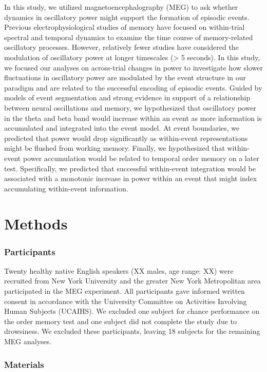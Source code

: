 In this study, we utilized magnetoencephalography (MEG) to ask whether
dynamics in oscillatory power might support the formation of episodic
events. Previous electrophysiological studies of memory have focused on
within-trial spectral and temporal dynamics to examine the time course
of memory-related oscillatory processes. However, relatively fewer
studies have considered the modulation of oscillatory power at longer
timescales (\textgreater{} 5 seconds). In this study, we focused our
analyses on across-trial changes in power to investigate how slower
fluctuations in oscillatory power are modulated by the event structure
in our paradigm and are related to the successful encoding of episodic
events. Guided by models of event segmentation and strong evidence in
support of a relationship between neural oscillations and memory, we
hypothesized that oscillatory power in the theta and beta band would
increase within an event as more information is accumulated and
integrated into the event model. At event boundaries, we predicted that
power would drop significantly as within-event representations might be
flushed from working memory. Finally, we hypothesized that within-event
power accumulation would be related to temporal order memory on a later
test. Specifically, we predicted that successful within-event
integration would be associated with a monotonic increase in power
within an event that might index accumulating within-event information.

\section{Methods}\label{methods}

\subsubsection{Participants}\label{participants}

Twenty healthy native English speakers (XX males, age range: XX) were
recruited from New York University and the greater New York Metropolitan
area participated in the MEG experiment. All participants gave informed
written consent in accordance with the University Committee on
Activities Involving Human Subjects (UCAIHS). We excluded one subject
for chance performance on the order memory test and one subject did not
complete the study due to drowsiness. We excluded these participants,
leaving 18 subjects for the remaining MEG analyses.

\subsubsection{Materials}\label{materials}

